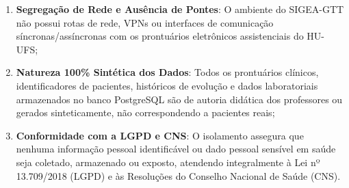 \begin{enumerate}
    \item \textbf{Segregação de Rede e Ausência de Pontes}: O ambiente do SIGEA-GTT não possui rotas de rede, VPNs ou interfaces de comunicação síncronas/assíncronas com os prontuários eletrônicos assistenciais do HU-UFS;
    \item \textbf{Natureza 100\% Sintética dos Dados}: Todos os prontuários clínicos, identificadores de pacientes, históricos de evolução e dados laboratoriais armazenados no banco PostgreSQL são de autoria didática dos professores ou gerados sinteticamente, não correspondendo a pacientes reais;
    \item \textbf{Conformidade com a LGPD e CNS}: O isolamento assegura que nenhuma informação pessoal identificável ou dado pessoal sensível em saúde seja coletado, armazenado ou exposto, atendendo integralmente à Lei nº 13.709/2018 (LGPD) e às Resoluções do Conselho Nacional de Saúde (CNS).
\end{enumerate}
